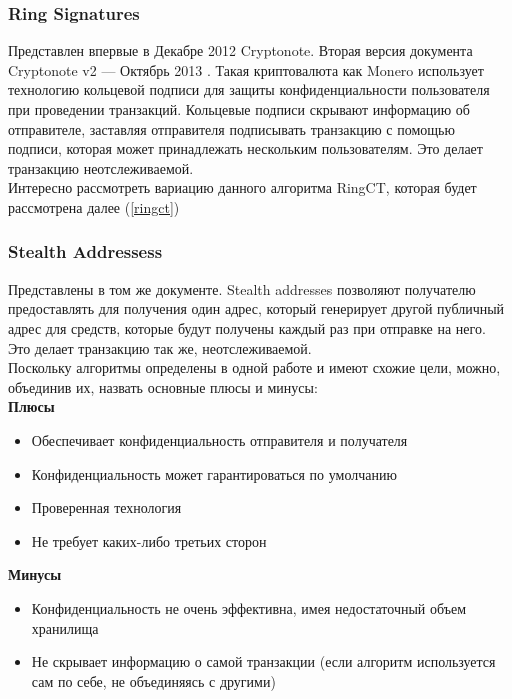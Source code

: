 \subsubsection{Ring Signatures}
Представлен впервые в Декабре 2012 \cite{VanSaberhagen2012} Cryptonote. Вторая версия документа
Cryptonote v2 --- Октябрь 2013 \cite{VanSaberhagen2013}.
Такая криптовалюта как Monero использует технологию кольцевой
подписи для защиты конфиденциальности пользователя при проведении транзакций.
Кольцевые подписи скрывают информацию об отправителе, заставляя отправителя
подписывать транзакцию с помощью подписи, которая может принадлежать нескольким
пользователям. Это делает транзакцию неотслеживаемой.\\
Интересно рассмотреть вариацию данного алгоритма RingCT, которая будет
рассмотрена далее (\ref{ringct})
\subsubsection{Stealth Addressess}
Представлены в том же документе. Stealth addresses позволяют получателю
предоставлять для получения один адрес, который генерирует другой публичный
адрес для средств, которые будут получены каждый раз при отправке на него. Это
делает транзакцию так же, неотслеживаемой.\\

Поскольку алгоритмы определены в одной работе и имеют схожие цели, можно,
объединив их, назвать основные плюсы и минусы:\\
\textbf{Плюсы}
\begin{itemize}
    \item Обеспечивает конфиденциальность отправителя и получателя
    \item Конфиденциальность может гарантироваться по умолчанию
    \item Проверенная технология
    \item Не требует каких-либо третьих сторон
\end{itemize}
\textbf{Минусы}
\begin{itemize}
    \item Конфиденциальность не очень эффективна, имея недостаточный объем
          хранилища
    \item Не скрывает информацию о самой транзакции (если алгоритм
          используется сам по себе, не объединяясь с другими)
\end{itemize}

